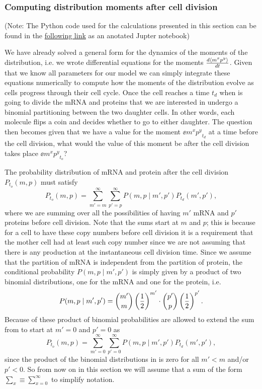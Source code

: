 \subsubsection{Computing distribution moments after cell division}

(Note: The Python code used for the calculations presented in this section can
be found in the
\href{https://www.rpgroup.caltech.edu//chann_cap/software/binomial_moments.html}{following
link} as an anotated Jupter notebook)

We have already solved a general form for the dynamics of the moments of the
distribution, i.e. we wrote differential equations for the moments ${d\left\langle m^x
p^y \right\rangle\over dt}$. Given that we know all parameters for our model we can simply
integrate these equations numerically to compute how the moments of the
distribution evolve as cells progress through their cell cycle. Once the cell
reaches a time $t_d$ when is going to divide the mRNA and proteins that we are
interested in undergo a binomial partitioning between the two daughter cells.
In other words, each molecule flips a coin and decides whether to go to either
daughter. The question then becomes given that we have a value for the moment
$\ee{m^x p^y}_{t_d}$ at a time before the cell division, what would the value
of this moment be after the cell division takes place $\ee{m^x p^y}_{t_o}$?

The probability distribution of mRNA and protein after the cell division
$P_{t_o}(m, p)$ must satisfy
\begin{equation}
  P_{t_o}(m, p) = \sum_{m'=m}^\infty \sum_{p'=p}^\infty 
                  P(m, p \mid m', p') P_{t_d}(m', p'),
\label{eq_dist_post_div}
\end{equation}
where we are summing over all the possibilities of having $m'$ mRNA and $p'$
proteins before cell division. Note that the sums start at $m$ and $p$; this is
because for a cell to have these copy numbers before cell division it is a
requirement that the mother cell had at least such copy number since we are not
assuming that there is any production at the instantaneous cell division time.
Since we assume that the partition of mRNA is independent from the partition of
protein, the conditional probability $P(m, p \mid m', p')$ is simply given by a
product of two binomial distributions, one for the mRNA and one for the
protein, i.e.
\begin{equation}
P(m, p \mid m', p') = {m' \choose m} \left( {1 \over 2} \right)^{m'} \cdot
                      {p' \choose p} \left( {1 \over 2} \right)^{p'}.
\label{eq_binom_prod}
\end{equation}
Because of these product of binomial probabilities are allowed to extend the
sum from
 to start at $m'=0$ and $p'=0$ as
\begin{equation}
  P_{t_o}(m, p) = \sum_{m'=0}^\infty \sum_{p'=0}^\infty 
                  P(m, p \mid m', p') P_{t_d}(m', p'),
\end{equation}
since the product of the binomial distributions in  is zero
for all $m' < m$ and/or $p' < 0$. So from now on in this section we will assume
that a sum of the form $\sum_x \equiv \sum_{x=0}^\infty$ to simplify notation.

